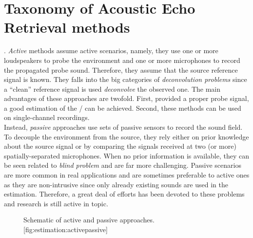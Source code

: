 \section{Taxonomy of Acoustic Echo Retrieval methods}\label{sec:estimation:taxonomy}


.
\textit{Active} methods assume active scenarios, namely, they use one or more loudspeakers to probe the environment and one or more microphones to record the propagated probe sound.
Therefore, they assume that the source reference signal is known.
They falls into the big categories of \textit{deconvolution problems} since a ``clean'' reference signal is used \textit{deconvolve} the observed one.
The main advantages of these approaches are twofold.
First, provided a proper probe signal, a good estimation of the \RIR/ can be achieved.
Second, these methods can be used on single-channel recordings.
\\Instead, \textit{passive} approaches use sets of passive sensors to record the sound field.
To decouple the environment from the source, they rely either on prior knowledge about the source signal or by comparing the signals received at two (or more) spatially-separated microphones.
When no prior information is available, they can be seen related to \textit{blind problem} and are far more challenging.
Passive scenarios are more common in real applications and are sometimes preferable to active ones as they are non-intrusive since only already existing sounds are used in the estimation.
Therefore, a great deal of efforts has been devoted to these problems and research is still active in topic.

\begin{figure}[h]
    \begin{sidecaption}{%
        Schematic of active and passive approaches.
    }[fig:estimation:activepassive]
    \centering
    \resizebox{\linewidth}{!}{
        
    }
    \end{sidecaption}
\end{figure}


